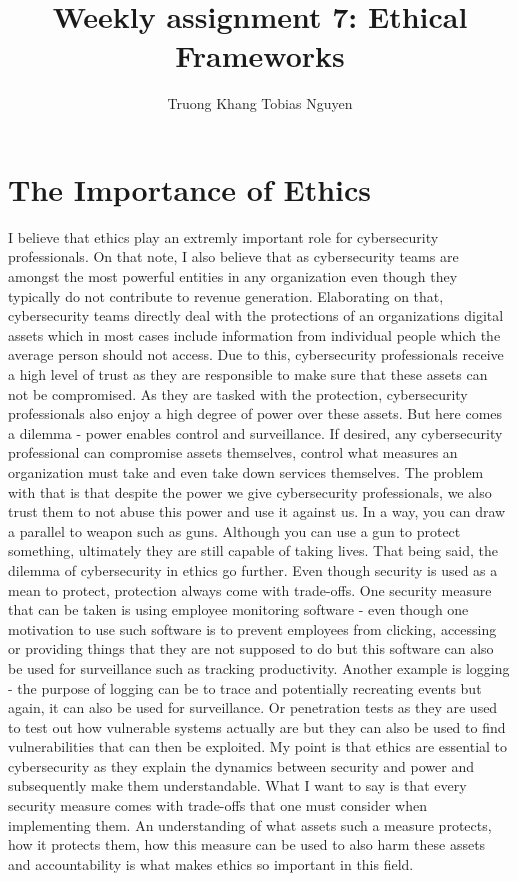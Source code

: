 \documentclass[12pt]{article}
\title{Weekly assignment 7: Ethical Frameworks}
\author{Truong Khang Tobias Nguyen}
\date{}
\begin{document}
\maketitle

\section{The Importance of Ethics}
I believe that ethics play an extremly important role for cybersecurity professionals. On that note, I also believe that as cybersecurity teams are amongst the most powerful entities in any organization even though they typically do not contribute to revenue generation. Elaborating on that, cybersecurity teams directly deal with the protections of an organizations digital assets which in most cases include information from individual people which the average person should not access.
\newline
Due to this, cybersecurity professionals receive a high level of trust as they are responsible to make sure that these assets can not be compromised. As they are tasked with the protection, cybersecurity professionals also enjoy a high degree of power over these assets. But here comes a dilemma - power enables control and surveillance. If desired, any cybersecurity professional can compromise assets themselves, control what measures an organization must take and even take down services themselves. The problem with that is that despite the power we give cybersecurity professionals, we also trust them to not abuse this power and use it against us. In a way, you can draw a parallel to weapon such as guns. Although you can use a gun to protect something, ultimately they are still capable of taking lives.
\newline
That being said, the dilemma of cybersecurity in ethics go further. Even though security is used as a mean to protect, protection always come with trade-offs. One security measure that can be taken is using employee monitoring software - even though one motivation to use such software is to prevent employees from clicking, accessing or providing things that they are not supposed to do but this software can also be used for surveillance such as tracking productivity. Another example is logging - the purpose of logging can be to trace and potentially recreating events but again, it can also be used for surveillance. Or penetration tests as they are used to test out how vulnerable systems actually are but they can also be used to find vulnerabilities that can then be exploited.
\newline
My point is that ethics are essential to cybersecurity as they explain the dynamics between security and power and subsequently make them understandable. What I want to say is that every security measure comes with trade-offs that one must consider when implementing them. An understanding of what assets such a measure protects, how it protects them, how this measure can be used to also harm these assets and accountability is what makes ethics so important in this field.
\end{document}
